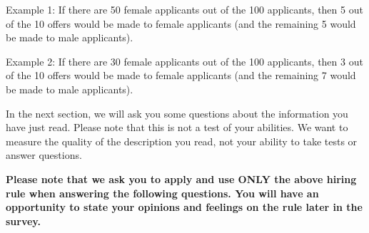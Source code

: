 \documentclass{article}
\begin{document}
Example 1: If there are 50 female applicants out of the 100 applicants, then 5 out of the 10 offers would be made to female applicants (and the remaining 5 would be made to male applicants).

Example 2: If there are 30 female applicants out of the 100 applicants, then 3 out of the 10 offers would be made to female applicants (and the remaining 7 would be made to male applicants).

In the next section, we will ask you some questions about the information you have just read. Please note that this is not a test of your abilities. We want to measure the quality of the description you read, not your ability to take tests or answer questions.

\textbf{Please note that we ask you to apply and use ONLY the above hiring rule when answering the following questions. You will have an opportunity to state your opinions and feelings on the rule later in the survey.}
\end{document}
